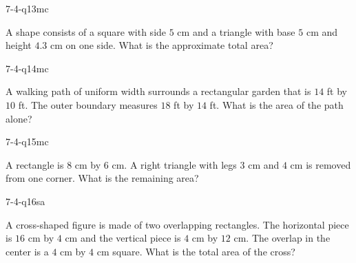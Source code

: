 \begin{practiceQuestion}{7-4-q13}{mc}
\begin{questionText}
A shape consists of a square with side $5$ cm and a triangle with base $5$ cm and height $4.3$ cm on one side. What is the approximate total area?
\end{questionText}
\end{practiceQuestion}

\begin{practiceQuestion}{7-4-q14}{mc}
\begin{questionText}
A walking path of uniform width surrounds a rectangular garden that is $14$ ft by $10$ ft. The outer boundary measures $18$ ft by $14$ ft. What is the area of the path alone?
\end{questionText}
\end{practiceQuestion}

\begin{practiceQuestion}{7-4-q15}{mc}
\begin{questionText}
A rectangle is $8$ cm by $6$ cm. A right triangle with legs $3$ cm and $4$ cm is removed from one corner. What is the remaining area?
\end{questionText}
\end{practiceQuestion}


\begin{practiceQuestion}{7-4-q16}{sa}
\begin{questionText}
A cross-shaped figure is made of two overlapping rectangles. The horizontal piece is $16$ cm by $4$ cm and the vertical piece is $4$ cm by $12$ cm. The overlap in the center is a $4$ cm by $4$ cm square. What is the total area of the cross?
\end{questionText}
\end{practiceQuestion}

